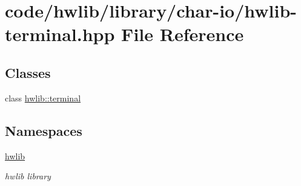 \hypertarget{hwlib-terminal_8hpp}{}\section{code/hwlib/library/char-\/io/hwlib-\/terminal.hpp File Reference}
\label{hwlib-terminal_8hpp}
\subsection*{Classes}
\begin{DoxyCompactItemize}
\item 
class \hyperlink{classhwlib_1_1terminal}{hwlib\+::terminal}
\end{DoxyCompactItemize}
\subsection*{Namespaces}
\begin{DoxyCompactItemize}
\item 
 \hyperlink{namespacehwlib}{hwlib}
\begin{DoxyCompactList}\small\item\em hwlib library \end{DoxyCompactList}\end{DoxyCompactItemize}
